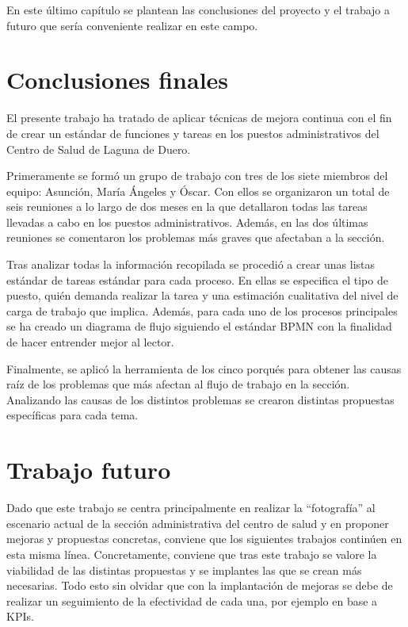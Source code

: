 En este último capítulo se plantean las conclusiones del proyecto y el trabajo a futuro que sería conveniente realizar en este campo.

\section{Conclusiones finales}

El presente trabajo ha tratado de aplicar técnicas de mejora continua con el fin de crear un estándar de funciones y tareas en los puestos administrativos del Centro de Salud de Laguna de Duero.

Primeramente se formó un grupo de trabajo con tres de los siete miembros del equipo: Asunción, María Ángeles y Óscar.
Con ellos se organizaron un total de seis reuniones a lo largo de dos meses en la que detallaron todas las tareas llevadas a cabo en los puestos administrativos. Además, en las dos últimas reuniones se comentaron los problemas más graves que afectaban a la sección.

Tras analizar todas la información recopilada se procedió a crear unas listas estándar de tareas estándar para cada proceso.
En ellas se especifica el tipo de puesto, quién demanda realizar la tarea y una estimación cualitativa del nivel de carga de trabajo que implica.
Además, para cada uno de los procesos principales se ha creado un diagrama de flujo siguiendo el estándar BPMN con la finalidad de hacer entrender mejor al lector.

Finalmente, se aplicó la herramienta de los cinco porqués para obtener las causas raíz de los problemas que más afectan al flujo de trabajo en la sección.
Analizando las causas de los distintos problemas se crearon distintas propuestas específicas para cada tema.

\section{Trabajo futuro}

Dado que este trabajo se centra principalmente en realizar la ``fotografía'' al escenario actual de la sección administrativa del centro de salud y en proponer mejoras y propuestas concretas, conviene que los siguientes trabajos continúen en esta misma línea. Concretamente, conviene que tras este trabajo se valore la viabilidad de las distintas propuestas y se implantes las que se crean más necesarias. Todo esto sin olvidar que con la implantación de mejoras se debe de realizar un seguimiento de la efectividad de cada una, por ejemplo en base a KPIs.